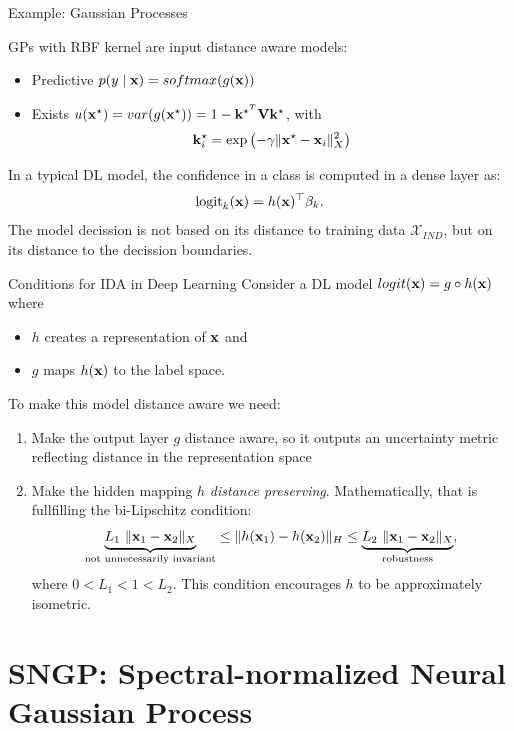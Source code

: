 \documentclass[xcolor=table]{beamer}
\newcommand{\pred}{p(y \mid \bx)}
\newcommand{\xind}{\mathcal X_{IND}}
\DeclarePairedDelimiter\norm{\lVert}{\rVert}%
\begin{document}
\begin{frame}{Example: Gaussian Processes}



GPs with RBF kernel are input distance aware models:
\begin{itemize}
    \item Predictive \(\pred = softmax(g(\bx))\)
    \item Exists \(u({\mathbf x}^\star) = var(g({\mathbf x}^\star)) = 1- {\mathbf k}^{\star^T} {\mathbf V} {\mathbf k}^\star\), with
    \[
    \bk_i^\star = \exp \left( -\gamma \norm{\bx^\star - \bx_i}_{X}^2\right)
    \]
\end{itemize}
\pause
In a typical DL model, the confidence in a class is computed in a dense layer as:
\[
\text{logit}_k({\mathbf x}) = h({\mathbf x})^\top \beta_k.
\]
The model decission is not based on its distance to training data \(\xind\), but on its distance to the decission boundaries.
    
\end{frame}

\begin{frame}{Conditions for IDA in Deep Learning}
Consider a DL model \(logit({\mathbf x}) = g \circ h({\mathbf x})\) where 

\begin{itemize}
    \item \(h\) creates a representation of \({\mathbf x}\) and
    \item \(g\) maps \(h({\mathbf x})\) to the label space. 
\end{itemize} 
To make this model distance aware we need:
\pause
\begin{enumerate}
    \item Make the output layer \(g\) distance aware, so it outputs an uncertainty metric reflecting distance in the representation space
    \pause
    \item Make the hidden mapping \(h\) \emph{distance preserving}. 
    \pause 
    Mathematically, that is fullfilling the bi-Lipschitz condition:
    \[
    \underbrace{L_1 \ \norm{\bx_1-\bx_2}_X}_{\text{not unnecessarily invariant}} \leq \norm{h(\bx_1) - h(\bx_2)}_H \leq \underbrace{L_2 \ \norm{\bx_1 - \bx_2}_X}_{\text{robustness}},
    \]
    where \(0 < L_1 < 1 < L_2\). This condition encourages \(h\) to be approximately isometric.
\end{enumerate}
    
\end{frame}

\section{SNGP: Spectral-normalized Neural Gaussian Process}
\end{document}
